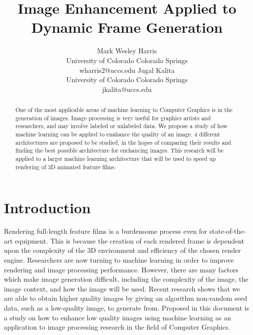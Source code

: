 \documentclass[letterpaper]{article} %
\title{Image Enhancement Applied to Dynamic Frame Generation}
\author{Mark Wesley Harris\\ %
University of Colorado Colorado Springs\\
wharris2@uccs.edu %
\And
Jugal Kalita\\
University of Colorado Colorado Springs\\
jkalita@uccs.edu
}
\begin{document}
\maketitle

\begin{abstract}
One of the most applicable areas of machine learning to Computer Graphics is in the
generation of images. Image processing is very useful for graphics artists and
researchers, and may involve labeled or unlabeled data. We propose
a study of how machine learning can be applied to enahance the quality of an image.
4 different architectures are proposed to be studied, in the hopes of comparing
their results and finding the best possible architecture for enchancing images.
This research will be applied to a larger machine learning architecture that will be used to
speed up rendering of 3D animated feature films.
\end{abstract}

\section{Introduction}
\label{sec:introduction}
Rendering full-length feature films is a burdensome process
even for state-of-the-art equipment.
This is because the creation of each rendered frame is dependent upon the
complexity of the 3D environment and
efficiency of the chosen render engine.
Researchers are now turning to machine learning in order to improve
rendering and image processing performance.
However, there are many factors which make image generation difficult, including
the complexity of the image, the image context, and how the image will be used.
Recent research shows that we are able to obtain higher quality images by giving
an algorithm non-random seed data, such as a low-quality image, to generate from.
Proposed in this document is a study
on how to enhance low quality images using machine learning
as an application to image processing research in the field of Computer Graphics.

\end{document}
